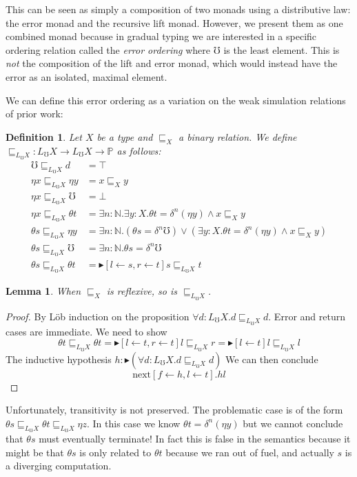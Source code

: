 \documentclass{article}
\newtheorem{definition}{Definition}[section]
\newtheorem{lemma}{Lemma}[section]
\newcommand{\prop}{\mathbb P}
\newcommand{\later}{{\blacktriangleright}}
\newcommand{\err}{\mho}
\newcommand{\errlift}{L_\err}
\newcommand{\ltdynp}[1]{\mathrel{\sqsubseteq_{#1}}}
\newcommand{\ltdynlift}[1]{\mathrel{\sqsubseteq_{\errlift#1}}}
\begin{document}
This can be seen as simply a composition of two monads using a
distributive law: the error monad and the recursive lift monad.
%
However, we present them as one combined monad because in gradual
typing we are interested in a specific ordering relation called the
\emph{error ordering} where $\err$ is the least element. This is
\emph{not} the composition of the lift and error monad, which would
instead have the error as an isolated, maximal element.

We can define this error ordering as a variation on the weak
simulation relations of prior work:
\begin{definition}
  Let $X$ be a type and $\sqsubseteq_X$ a binary relation. We define
  $\ltdynp{\errlift X} : \errlift X \to \errlift X \to \prop$ as follows:
  \begin{align*}
    \err \ltdynlift X d &= \top\\
    \eta x \ltdynlift X \eta y &= x \ltdynp X y\\
    \eta x \ltdynlift X \err &= \bot\\
    \eta x \ltdynlift X \theta t &= \exists{n:\mathbb N}.\exists{y: X}. \theta t = \delta^n (\eta y) \wedge x \ltdynp X y\\
    \theta s \ltdynlift X \eta y &= \exists{n:\mathbb N}.(\theta s = \delta^n \err)\vee(\exists{y: X}. \theta t = \delta^n (\eta y) \wedge x \ltdynp X y)\\
    \theta s \ltdynlift X \err &= \exists{n:\mathbb N}.\theta s = \delta^n \err\\
    \theta s \ltdynlift X \theta t &= \later[l \leftarrow s,r\leftarrow t] s \ltdynlift X t
  \end{align*}
\end{definition}

\begin{lemma}
  When $\ltdynp X$ is reflexive, so is $\ltdynlift X$.
\end{lemma}
\begin{proof}
  By L\"ob induction on the proposition $\forall d: \errlift X. d
  \ltdynlift X d$. Error and return cases are immediate.  We need to
  show
  \[ \theta t \ltdynlift X \theta t = \later[l \leftarrow t,r\leftarrow t] l \ltdynlift X r = \later[l \leftarrow t] l \ltdynlift X l \]
  The inductive hypothesis $h : \later (\forall d: \errlift X. d \ltdynlift X d)$
  We can then conclude
  \[ \text{next}[f \leftarrow h, l \leftarrow t]. h l \]
\end{proof}

Unfortunately, transitivity is not preserved.
%
The problematic case is of the form $\theta s \ltdynlift X \theta t
\ltdynlift X \eta z$. In this case we know $\theta t = \delta^n (\eta
y)$ but we cannot conclude that $\theta s$ must eventually terminate!
In fact this is false in the semantics because it might be that
$\theta s$ is only related to $\theta t$ because we ran out of fuel,
and actually $s$ is a diverging computation.
\end{document}
